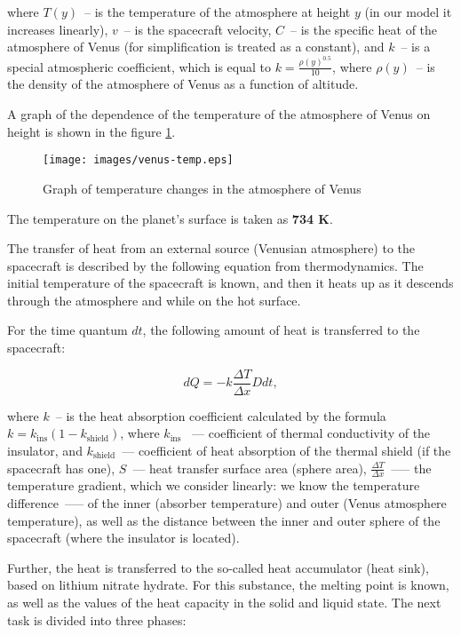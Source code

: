 \documentclass[12pt,a4paper]{article}
\begin{document}
where $T(y)$~-- is the temperature of the atmosphere at height $y$ (in our model it increases linearly), $v$~-- is the spacecraft velocity, $C$~-- is the specific heat of the atmosphere of Venus (for simplification is treated as a constant), and $k$~-- is a special atmospheric coefficient, which is equal to $k = \frac{\rho(y)^{0.5}}{10}$, where $\rho(y) $~-- is the density of the atmosphere of Venus as a function of altitude.

A graph of the dependence of the temperature of the atmosphere of Venus on height is shown in the figure \ref{Pic:venus_temp}.

\begin{figure}[tbh]
  \begin{center}
    \texttt{[image: images/venus-temp.eps]}
    \caption{Graph of temperature changes in the atmosphere of Venus}
    \label{Pic:venus_temp}
  \end{center}
\end{figure}

The temperature on the planet's surface is taken as \textbf{734 K}.

The transfer of heat from an external source (Venusian atmosphere) to the spacecraft is described by the following equation from thermodynamics. The initial temperature of the spacecraft is known, and then it heats up as it descends through the atmosphere and while on the hot surface.

For the time quantum $dt$, the following amount of heat is transferred to the spacecraft:

$$
dQ = -k \frac{\Delta T}{\Delta x} D dt,
$$

where $k$~-- is the heat absorption coefficient calculated by the formula $k = k_{\text{ins}} (1 - k_{\text{shield}})$, where $k_{\text{ins}}$ ~--- coefficient of thermal conductivity of the insulator, and $k_{\text{shield}}$~--- coefficient of heat absorption of the thermal shield (if the spacecraft has one), $S$~--- heat transfer surface area (sphere area), $ \frac{\Delta T}{\Delta x}$~--— the temperature gradient, which we consider linearly: we know the temperature difference~--— of the inner (absorber temperature) and outer (Venus atmosphere temperature), as well as the distance between the inner and outer sphere of the spacecraft (where the insulator is located).

Further, the heat is transferred to the so-called heat accumulator (heat sink), based on lithium nitrate hydrate. For this substance, the melting point is known, as well as the values of the heat capacity in the solid and liquid state. The next task is divided into three phases:
\end{document}
